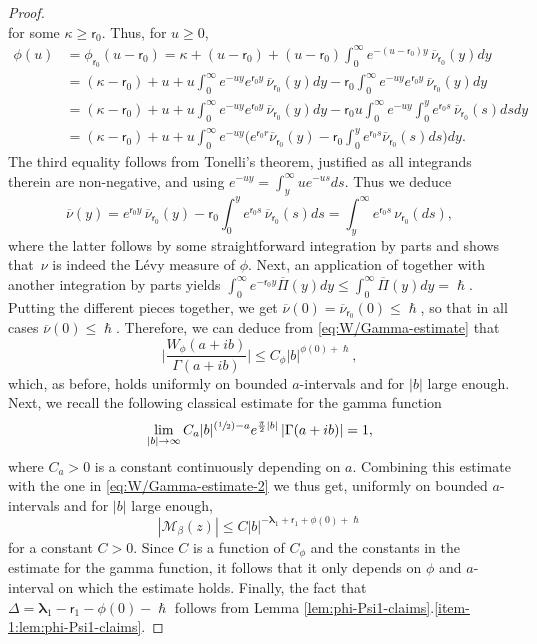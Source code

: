 \documentclass[JEP,XML,SOM,Unicode]{cedram}
\newcommand{\Psfrac}[2]{(\sfrac{#1}{#2})}
\theoremstyle{plain}
\theoremstyle{definition}
\newcommand{\calM}{\mathcal{M}}
\newcommand{\lam}{{\bm{\lambda}_1}}
\newcommand{\tet}{{\mathsf{r}_0}}
\newcommand{\vat}{{\mathsf{r}_1}}
\let\h\hslash
\let\bpsi\beta
\begin{document}
\begin{proof}
\begin{equation*}
\end{equation*}
for some $\kappa \geq \tet$. Thus, for $u \geq 0$,
\begin{align*}
\phi(u) &= \phi_{\tet}(u-\tet) = \kappa+(u-\tet)+(u-\tet)\int_0^\infty e^{-(u-\tet)y}\, \overline{\nu}_{\tet}(y)dy \\
&= (\kappa-\tet) + u + u \int_0^\infty e^{-uy} e^{\tet y}\,\overline{\nu}_{\tet}(y)dy -\tet \int_0^\infty e^{-uy}e^{\tet y}\, \overline{\nu}_{\tet}(y)dy \\
&= (\kappa-\tet) + u + u \int_0^\infty e^{-uy} e^{\tet y}\,\overline{\nu}_{\tet}(y)dy -\tet u \int_0^\infty e^{-uy} \int_0^y e^{\tet s}\, \overline{\nu}_{\tet}(s)ds dy \\
&= (\kappa-\tet) + u + u \int_0^\infty e^{-uy} \biggl( e^{\tet r}\overline{\nu}_{\tet}(y) - \tet\int_0^y e^{\tet s} \overline{\nu}_{\tet}(s)ds\biggr)dy.
\end{align*}
The third equality follows from Tonelli's theorem, justified as all integrands therein are non-negative, and using $e^{-uy} = \int_y^\infty ue^{-us} ds$. Thus we deduce
\begin{equation*}
\overline{\nu}(y) = e^{\tet y}\,\overline{\nu}_\tet(y) -\tet\int_0^y e^{\tet s}\, \overline{\nu}_\tet(s)ds = \int_y^\infty e^{\tet s}\,\nu_\tet(ds),
\end{equation*}
where the latter follows by some straightforward integration by parts and shows that~$\nu$ is indeed the Lévy measure of $\phi$. Next, an application of \cite[Prop.\,4.1(9)]{Patie-Savov-GeL} together with another integration by parts yields $\int_0^\infty e^{-\tet y} \overline{\Pi}(y)dy \leq \int_0^\infty \overline{\Pi}(y)dy = \h$. Putting the different pieces together, we get $\overline{\nu}(0) = \overline{\nu}_\tet(0) \leq \h$, so that in all cases $\overline{\nu}(0) \leq \h$. Therefore, we can deduce from \eqref{eq:W/Gamma-estimate} that
\begin{equation}
\label{eq:W/Gamma-estimate-2}
\biggl| \frac{W_\phi(a+ib)}{\Gamma(a+ib)}\biggr| \leq C_\phi |b|^{\phi(0)+\h},
\end{equation}
which, as before, holds uniformly on bounded $a$-intervals and for $|b|$ large enough. Next, we recall the following classical estimate for the gamma function
\begin{equation}
\label{eq:classical-Gamma}
\lim_{|b| \to \infty} C_a|b|^{\Psfrac{1}{2}-a} e^{\frac{\pi}{2}|b|} \left|\Gamma(a+ib)\right| =1,
\end{equation}
where $C_a > 0$ is a constant continuously depending on $a$. Combining this estimate with the one in \eqref{eq:W/Gamma-estimate-2} we thus get, uniformly on bounded $a$-intervals and for $|b|$ large enough,
\begin{equation*}
\left|\calM_\bpsi(z)\right| \leq C|b|^{-\lam+\vat + \phi(0) + \h}
\end{equation*}
for a constant $C > 0$. Since $C$ is a function of $C_\phi$ and the constants in the estimate for the gamma function, it follows that it only depends on $\phi$ and $a$-interval on which the estimate holds. Finally, the fact that $\Delta = \lam-\vat-\phi(0)- \h$ follows from Lemma \ref{lem:phi-Psi1-claims}.\eqref{item-1:lem:phi-Psi1-claims}.
\end{proof}
\end{document}
